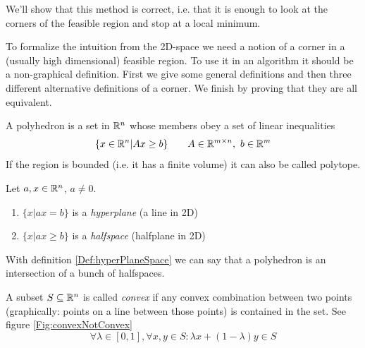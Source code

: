We'll show that this method is correct, i.e. that it is enough to look at the corners of the feasible region and stop at a local minimum.

To formalize the intuition from the 2D-space we need a notion of a corner in a (usually high dimensional) feasible region. To use it in an algorithm it should be a non-graphical definition. First we give some general definitions and then three different alternative definitions of a corner. We finish by proving that they are all equivalent.

\begin{Def}[Polyhedron]\label{Def:polyhedron} A polyhedron is a set in $\mathbb{R}^n$ whose members obey a set of linear inequalities
\[\{x\in \mathbb{R}^n | Ax \geq b\} \qquad A\in \mathbb{R}^{m\times n},\ b\in \mathbb{R}^m\]
If the region is bounded (i.e. it has a finite volume) it can also be called polytope.
\end{Def}

\begin{Def} \label{Def:hyperPlaneSpace} Let $a,x\in \mathbb{R}^n$, $a\neq 0$. 
\begin{enumerate}
\item $\{x|ax=b\}$ is a \emph{hyperplane} (a line in 2D)
\item $\{x|ax\geq b\}$ is a \emph{halfspace} (halfplane in 2D)
\end{enumerate}
\end{Def}

With definition \ref{Def:hyperPlaneSpace} we can say that a polyhedron is an intersection of a bunch of halfspaces.

\begin{Def} A subset $S \subseteq \mathbb{R}^n$ is called \emph{convex} if any convex combination between two points (graphically: points on a line between those points) is contained in the set. See figure \ref{Fig:convexNotConvex}
\[\forall \lambda \in [0,1], \forall x,y\in S: \lambda x + (1-\lambda) y \in S\]
\end{Def}

